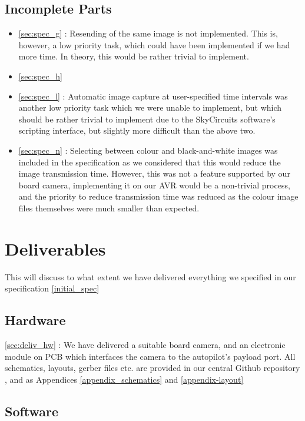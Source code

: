 \subsection{Incomplete Parts}
\label{sec:incomplete}

\begin{itemize}
\item \ref{sec:spec_g} : Resending of the same image is not implemented. 
This is, however, a low priority task, which could have been implemented 
if we had more time. In theory, this would be rather trivial to implement.
\item \ref{sec:spec_h} 
\item \ref{sec:spec_l} : Automatic image capture at user-specified time 
intervals was another low priority task which we were unable to implement, 
but which should be rather trivial to implement due to the SkyCircuits 
software's scripting interface, but slightly more difficult than the above
two.
\item \ref{sec:spec_n} : Selecting between colour and black-and-white images 
was included in the specification as we considered that this would reduce 
the image transmission time. However, this was not a feature supported 
by our board camera, implementing it on our AVR would be a non-trivial 
process, and the priority to reduce transmission time was reduced as the 
colour image files themselves were much smaller than expected.
\end{itemize}

\section{Deliverables}

This will discuss to what extent we have delivered everything we specified 
in our specification \ref{initial_spec}

\subsection{Hardware}

\ref{sec:deliv_hw} : We have delivered a suitable board camera, and an 
electronic module on PCB which interfaces the camera to the autopilot's 
payload port. All schematics, layouts, gerber files etc. are provided in 
our central Github repository \cite{github}, and as Appendices \ref{appendix_schematics} and \ref{appendix-layout}

\subsection{Software}


